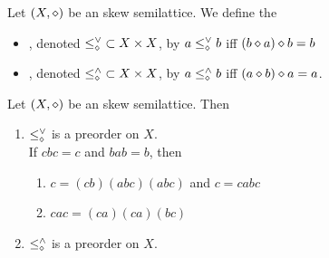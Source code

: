 \documentclass{book}
\begin{document}
	\begin{defn} 
		Let $(X, \diamond)$ be an skew semilattice. We define the 
		\begin{itemize}
			\item {}, denoted ${\leq^{\vee}_{\diamond}} \subset X \times X$, by $a \leq^{\vee}_{\diamond} b$ iff $(b \diamond a) \diamond b = b$
			\item {}, denoted ${\leq^{\wedge}_{\diamond}} \subset X \times X$, by $a \leq^{\wedge}_{\diamond} b$ iff $(a \diamond b) \diamond a = a$. 
		\end{itemize}
	\end{defn}
	
	\begin{ex} 
		Let $(X, \diamond)$ be an skew semilattice. Then 
		\begin{enumerate}
			\item $\leq^{\vee}_{\diamond}$ is a preorder on $X$. \\
			 If $cbc = c$ and $bab = b$, then 
			\begin{enumerate}
				\item $c = (cb)(abc)(abc)$ and $c = cabc$
				\item $cac = (ca)(ca)(bc)$
			\end{enumerate}
			\item $\leq^{\wedge}_{\diamond}$ is a preorder on $X$.
		\end{enumerate}
	\end{ex}
	
\end{document}
